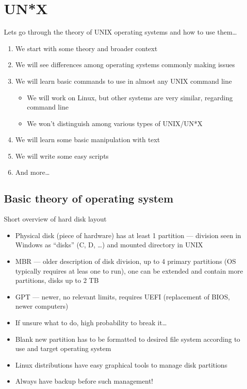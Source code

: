 \documentclass[compress, ucs, xelatex, 11pt, xcolor=svgnames,
  hyperref={
    bookmarks=true,
    unicode=true,
    colorlinks=true,
    pdftitle={Linux, command line and MetaCentrum},
    plainpages=false,
    pdfauthor={Vojtech Zeisek},
    pdfsubject={Course about use of Linux command line, writing shell scripts and using MetaCentrum of CESNET},
    pdfcreator={XeLaTeX, http://www.xelatex.org/},
    pdfkeywords={Linux, GNU, BASH, shell, command line, MetaCentrum},
    linkcolor=Sienna,
    anchorcolor=black,
    citecolor=green,
    filecolor=magenta,
    menucolor=Sienna,
    urlcolor=cyan,
    pdftex},
  url={hyphens, lowtilde} %
  ]{beamer}
\begin{document}
\section{UN*X}

\begin{frame}{Lets go through the theory of UNIX operating systems and how to use them\ldots}
\begin{enumerate}
  \item We start with some theory and broader context
  \item We will see differences among operating systems commonly making issues
  \item We will learn basic commands to use in almost any UNIX command line
  \begin{itemize}
    \item We will work on Linux, but other systems are very similar, regarding command line
    \item We won't distinguish among various types of UNIX/UN*X
  \end{itemize}
  \item We will learn some basic manipulation with text
  \item We will write some easy scripts
  \item And more\ldots
\end{enumerate}
\end{frame}

\subsection{Basic theory of operating system}

\begin{frame}{Short overview of hard disk layout}
\begin{itemize}
  \item Physical disk (piece of hardware) has at least 1 partition --- division seen in Windows as ``disks'' (C, D, \ldots) and mounted directory in UNIX
  \item MBR --- older description of disk division, up to 4 primary partitions (OS typically requires at leas one to run), one can be extended and contain more partitions, disks up to 2 TB
  \item GPT --- newer, no relevant limits, requires UEFI (replacement of BIOS, newer computers)
  \item If unsure what to do, high probability to break it\ldots
  \item Blank new partition has to be formatted to desired file system according to use and target operating system
  \item Linux distributions have easy graphical tools to manage disk partitions
  \item Always have backup before such management!
\end{itemize}
\end{frame}
\end{document}
